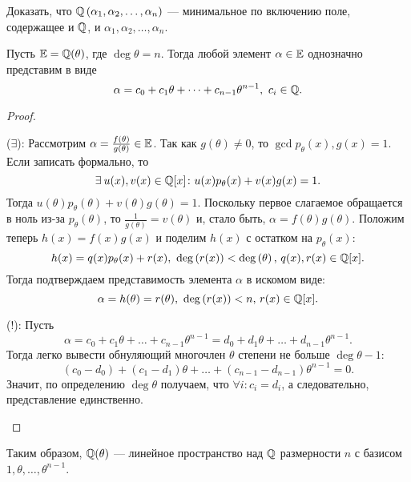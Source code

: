 \begin{nproblem}
\label{prb:IV-2}
    Доказать, что $\mathbb{Q}\left(\alpha_1, \alpha_2, \dots, \alpha_n\right)$ --- минимальное по включению поле, содержащее и $\mathbb{Q}$, и $\alpha_1, \alpha_2, \dots, \alpha_n$.
\end{nproblem}

\begin{nlemma}
\label{lm:IV-5}
    Пусть $\mathbb{E} = \mathbb{Q}(\theta)$, где $\deg{\theta} = n$. Тогда любой элемент $\alpha \in \mathbb{E}$ однозначно представим в виде
    \[
        \alpha = c_0 + c_1\theta + \dots + c_{n-1} \theta^{n-1},\ c_i \in \mathbb{Q}.
    \]
\end{nlemma}
\begin{proof}
\hfill
    \begin{statesp}
        \item[($\exists$):]
            Рассмотрим $\alpha = \frac{f(\theta)}{g(\theta)} \in \mathbb{E}$. Так как $g(\theta) \ne 0$, то ${\gcd{p_{\theta}(x), g(x)} = 1}$. Если записать формально, то
            \[
                \exists u(x), v(x) \in \QQ[x]\colon u(x) p_{\theta}(x) + v(x)g(x) = 1.
            \]
            Тогда $u(\theta) p_{\theta}(\theta) + v(\theta) g(\theta) = 1$. Поскольку первое слагаемое обращается в ноль из-за $p_{\theta}(\theta)$, то $\frac{1}{g(\theta)} = v(\theta)$ и, стало быть, $\alpha = f(\theta) g(\theta)$. Положим теперь ${h(x) = f(x)g(x)}$ и поделим $h(x)$ с остатком на $p_{\theta}(x)$:
            \[
                h(x) = q(x)p_{\theta}(x) + r(x),\ \deg{r(x)} < \deg{\theta},\, q(x), r(x) \in \QQ[x].
            \]
            Тогда подтверждаем представимость элемента $\alpha$ в искомом виде:
            \[
                \alpha = h(\theta) = r(\theta),\ \operatorname{deg}\left( r(x) \right) < n,\, r(x) \in \mathbb{Q}[x].
            \]
        \item[($!$):]
            Пусть 
            \[
                \alpha = c_0 + c_1\theta + \dots + c_{n-1}\theta^{n-1} = d_0 + d_1\theta + \dots + d_{n-1}\theta^{n-1}.
            \]
            Тогда легко вывести обнуляющий многочлен $\theta$ степени не больше $\deg{\theta-1}$:
            \[
                (c_0-d_0) + (c_1-d_1)\theta + \dots + (c_{n-1}-d_{n-1})\theta^{n-1} = 0.
            \]
            Значит, по определению $\deg{\theta}$ получаем, что $\forall i\colon c_i = d_i$, а следовательно, представление единственно.
    \end{statesp}
\end{proof}

\begin{remark}
    Таким образом, $\mathbb{Q}(\theta)$ --- линейное пространство над $\mathbb{Q}$ размерности $n$ с базисом $1, \theta, \dots, \theta^{n-1}$.
\end{remark}

